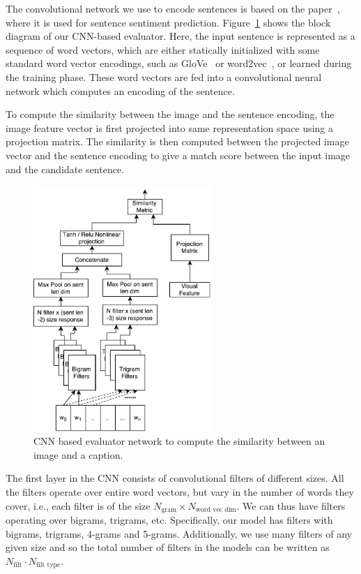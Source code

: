 The convolutional network we use to encode sentences is based on the
paper~\cite{kim:2014:CNNsent}, where it is used for sentence sentiment
prediction.
Figure~\ref{fig:CNNEval} shows the block diagram of our CNN-based
evaluator.  
Here, the input sentence is represented as a sequence of word vectors,
which are either statically initialized with some standard word vector
encodings, such as GloVe~\cite{pennington2014glove} or
word2vec~\cite{mikolov2013distributed}, or learned during the training
phase.
These word vectors are fed into a convolutional neural network which
computes an encoding of the sentence.

To compute the similarity between the image and the sentence encoding,
the image feature vector is first projected into same representation
space using a projection matrix.
The similarity is then computed between the projected image vector and
the sentence encoding to give a match score between the input image
and the candidate sentence.

\begin{figure}[t] 
  \centering
  \includegraphics[width=0.6\textwidth]{./images/CnnEval.pdf} 
  \caption{CNN based evaluator network to compute the similarity between 
    an image and a caption.}
  \label{fig:CNNEval} 
\end{figure}


The first layer in the CNN consists of convolutional filters of
different sizes.  
All the filters operate over entire word vectors, but vary in the
number of words they cover, i.e., each filter is of the size
$N_{\text{gram}} \times N_{\text{word vec dim}}$. 
We can thus have filters operating over bigrams, trigrams, etc.
Specifically, our model has filters with bigrams, trigrams, 4-grams and
5-grams. 
Additionally, we use many filters of any given size and so the total
number of filters in the models can be written as
$N_{\text{filt}} \cdot N_{\text{filt type}}$.

